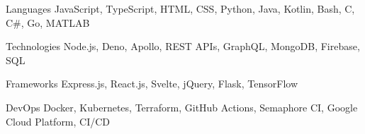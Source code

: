

\begin{cvskills}

  \cvskill
    {Languages} %
    {JavaScript, TypeScript, HTML, CSS, Python, Java, Kotlin, Bash, C, C\#, Go, MATLAB } %

  \cvskill
    {Technologies} %
    {Node.js, Deno, Apollo, REST APIs, GraphQL, MongoDB, Firebase, SQL} %

  \cvskill
    {Frameworks} %
    {Express.js, React.js, Svelte, jQuery, Flask, TensorFlow} %

  \cvskill
    {DevOps} %
    {Docker, Kubernetes, Terraform, GitHub Actions, Semaphore CI, Google Cloud Platform, CI/CD} %
    
\end{cvskills}
